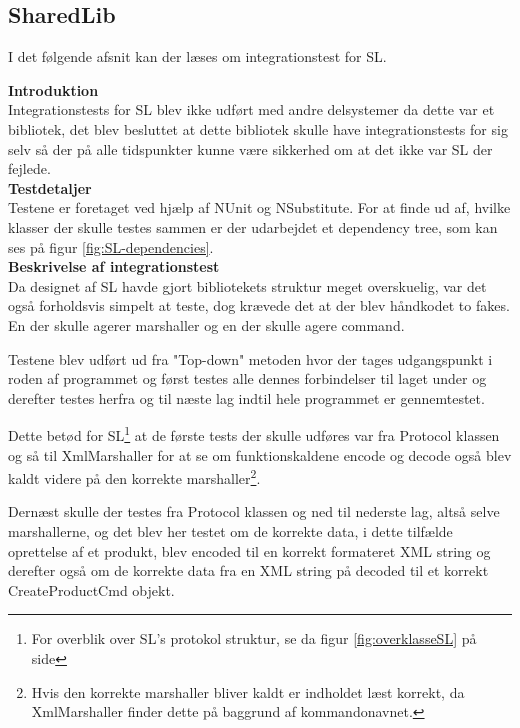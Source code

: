 \subsection{SharedLib}
I det følgende afsnit kan der læses om integrationstest for \gls{SL}.

\textbf{Introduktion}\\
Integrationstests for \gls{SL} blev ikke udført med andre delsystemer da dette var et bibliotek, det blev besluttet at dette bibliotek skulle have integrationstests for sig selv så der på alle tidspunkter kunne være sikkerhed om at det ikke var \gls{SL} der fejlede.\\

\textbf{Testdetaljer}\\
Testene er foretaget ved hjælp af NUnit og NSubstitute. For at finde ud af, hvilke klasser der skulle testes sammen er der udarbejdet et dependency tree, som kan ses på figur \ref{fig:SL-dependencies}.\\


\textbf{Beskrivelse af integrationstest}\\
Da designet af \gls{SL} havde gjort bibliotekets struktur meget overskuelig, var det også forholdsvis simpelt at teste, dog krævede det at der blev håndkodet to fakes. En der skulle agerer marshaller og en der skulle agere command. 

Testene blev udført ud fra "Top-down" metoden hvor der tages udgangspunkt i roden af programmet og først testes alle dennes forbindelser til laget under og derefter testes herfra og til næste lag indtil hele programmet er gennemtestet. 

Dette betød for \gls{SL}\footnote{For overblik over \gls{SL}'s protokol struktur, se da figur \ref{fig:overklasseSL} på side \pageref{fig:overklasseSL}} at de første tests der skulle udføres var fra Protocol klassen og så til XmlMarshaller for at se om funktionskaldene encode og decode også blev kaldt videre på den korrekte marshaller\footnote{Hvis den korrekte marshaller bliver kaldt er indholdet læst korrekt, da XmlMarshaller finder dette på baggrund af kommandonavnet.}.

Dernæst skulle der testes fra Protocol klassen og ned til nederste lag, altså selve marshallerne, og det blev her testet om de korrekte data, i dette tilfælde oprettelse af et produkt, blev encoded til en korrekt formateret XML string og derefter også om de korrekte data fra en XML string på decoded til et korrekt CreateProductCmd objekt.

